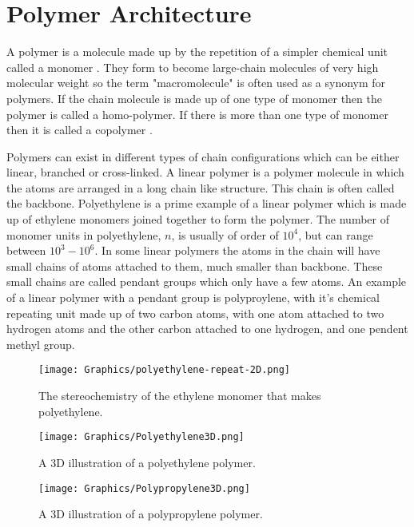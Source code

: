 \section{Polymer Architecture}

A polymer is a molecule made up by the repetition of a simpler chemical unit called a monomer \cite{bower2002}. They form to become large-chain molecules of very high molecular weight so the term "macromolecule" is often used as a synonym for polymers. If the chain molecule is made up of one type of monomer then the polymer is called a homo-polymer. If there is more than one type of monomer then it is called a copolymer \cite{Pure1996}. 

Polymers can exist in different types of chain configurations which can be either linear, branched or cross-linked. A linear polymer is a polymer molecule in which the atoms are arranged in a long chain like structure. This chain is often called the backbone. Polyethylene is a prime example of a linear polymer which is made up of ethylene monomers joined together to form the polymer. The number of monomer units in polyethylene, $n$, is usually of order of $10^{4}$, but can range between $10^{3}-10^{6}$. In some linear polymers the atoms in the chain will have small chains of atoms attached to them, much smaller than backbone. These small chains are called pendant groups which only have a few atoms. An example of a linear polymer with a pendant group is polyproylene, with it's chemical repeating unit made up of two carbon atoms, with one atom attached to two hydrogen atoms and the other carbon attached to one hydrogen, and one pendent methyl group.

\begin{figure}[htp]
\centering \texttt{[image: Graphics/polyethylene-repeat-2D.png]}
\caption{The stereochemistry of the ethylene monomer that makes polyethylene.}
\label{fig:polyethylene2D}
\end{figure}

\begin{figure}[htp]
\centering \texttt{[image: Graphics/Polyethylene3D.png]}
\caption{A 3D illustration of a polyethylene polymer.}
\label{fig:Polyethylene3D}
\end{figure}

\begin{figure}[htp]
\centering \texttt{[image: Graphics/Polypropylene3D.png]}
\caption{A 3D illustration of a polypropylene polymer.}
\label{fig:Polypropylene3D}
\end{figure}

